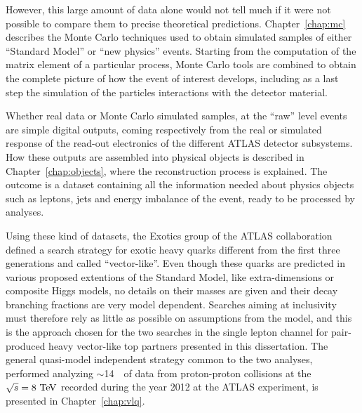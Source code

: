 However, this large amount of data alone would 
not tell much if it were not possible to
compare them to precise theoretical predictions.
Chapter~\ref{chap:mc} describes the Monte Carlo techniques used
to obtain simulated samples of either ``Standard Model'' %
or ``new physics'' events. 
Starting from the computation of the matrix element of a 
particular process, Monte Carlo tools
are combined to obtain the complete picture of how the
event of interest develops, including as a last step
the simulation of the particles interactions with the
detector material.

Whether real data or Monte Carlo simulated samples, at
the ``raw'' level events are simple digital outputs, coming respectively
from the real or simulated response of the read-out electronics
of the different ATLAS detector subsystems. How these outputs
are assembled into physical objects is described in Chapter~\ref{chap:objects},
where the reconstruction process is explained.
The outcome is a dataset containing all the information needed
about physics objects such as leptons, jets and energy 
imbalance of the event,
ready to be processed by analyses.


Using these kind of datasets, 
the Exotics group of the ATLAS collaboration defined a search strategy 
for exotic heavy quarks different from the first three generations 
and called ``vector-like''. Even though these quarks are
predicted in various proposed extentions of the Standard Model, 
like extra-dimensions or composite Higgs
models, no details on their masses are given and their decay branching fractions
are very model dependent. Searches aiming at inclusivity 
must therefore rely as little as possible on 
assumptions from the model, and this is the approach chosen for the
two searches in the single lepton channel
for pair-produced heavy vector-like top partners 
presented in this dissertation. The general quasi-model independent
strategy common to the two analyses, performed analyzing 
$\sim$14~\ifb\ of data from proton-proton collisions at the
 \cme\ $\rts=8\tev$ recorded during the year 2012 
at the ATLAS experiment, is presented in
Chapter~\ref{chap:vlq}.

